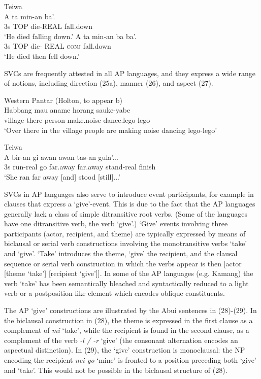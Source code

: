 \ea%
\label{ex:25}
 Teiwa \citep[305]{Klamer2010a}   \\
\ea
\gll A  ta  min-an  ba'. \\
 3s  TOP  die-REAL  fall.down    \\
\glt `He died falling down.'
\ex
\gll A  ta  min-an  ba  ba'.  \\
 3s  TOP  die- REAL  \textsc{conj} fall.down    \\
\glt `He died then fell down.'
\z
\z



SVCs are frequently attested in all AP languages, and they express a wide range of notions, including direction (25a), manner (26), and aspect (27).



\ea%
\label{ex:26}
Western Pantar (Holton, to appear b)    \\
\gll Habbang  mau  aname  horang  sauke-yabe \\
village  there  person  make.noise  dance.lego-lego   \\
\glt `Over there in the village people are making noise dancing lego-lego'
\z



\ea%
\label{ex:27}
Teiwa \citep[358]{Klamer2010a}    \\
\gll A   bir-an  gi  awan  awan  tas-an  gula'... \\
 3s  run-real   go  far.away  far.away  stand-real  finish  \\
\glt `She ran far away [and] stood [still]...'
\z


SVCs in AP languages also serve to introduce event participants, for example in clauses that express a `give'-event. This is due to the fact that the AP languages generally lack a class of simple ditransitive root verbs. (Some of the languages have one ditransitive verb, the verb `give'.) `Give' events involving three participants (actor, recipient, and theme) are typically expressed by means of biclausal or serial verb constructions involving the monotransitive verbs `take' and `give'. `Take' introduces the theme, `give' the recipient, and the clausal sequence or serial verb construction in which the verbs appear is then [actor [theme `take'] [recipient `give']]. In some of the AP languages (e.g. Kamang) the verb `take' has been semantically bleached and syntactically reduced to a light verb or a postposition-like element which encodes oblique constituents.

The AP `give' constructions are illustrated by the Abui sentences in (28)-(29). In the biclausal construction in (28), the theme is expressed in the first clause as a complement of \textit{mi} `take', while the recipient is found in the second clause, as a complement of the verb \textit{{}-l / -r} `give' (the consonant alternation encodes an aspectual distinction). In (29), the `give' construction is monoclausal: the NP encoding the recipient \textit{nei yo} `mine' is fronted to a position preceding both `give' and `take'. This would not be possible in the biclausal structure of (28).



